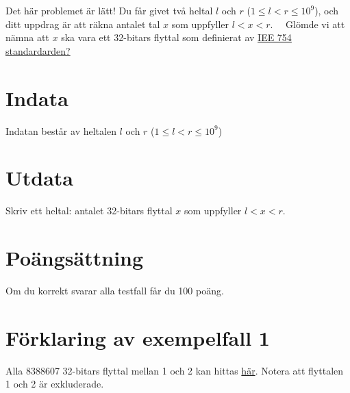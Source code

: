 \noindent

Det här problemet är lätt! Du får givet två heltal $l$ och $r$ ($1 \leq l < r \leq 10^9$), och
ditt uppdrag är att räkna antalet tal $x$ som uppfyller $l < x < r$.
\
\
Glömde vi att nämna att $x$ ska vara ett 32-bitars flyttal som definierat av
\href{https://sci-hub.3800808.com/10.1109/ieeestd.2008.4610935}{IEE 754 standardarden?}

\section*{Indata}
\noindent
Indatan består av heltalen $l$ och $r$ ($1 \leq l < r \leq 10^9$)

\section*{Utdata}
\noindent
Skriv ett heltal: antalet 32-bitars flyttal $x$ som uppfyller $l < x < r$.


\section*{Poängsättning}
Om du korrekt svarar alla testfall får du 100 poäng.

\section*{Förklaring av exempelfall 1}
Alla 8388607 32-bitars flyttal mellan 1 och 2 kan hittas \href{https://drive.google.com/file/d/1VAeaR44GEhSPsfwSVIbh_U-8YkdktChb/view?usp=drive_link}{här}.
Notera att flyttalen 1 och 2 är exkluderade.
